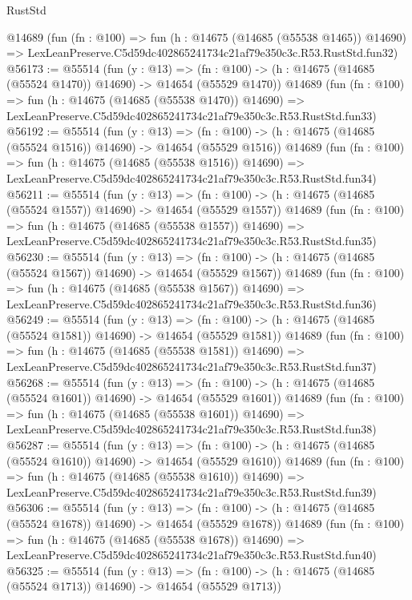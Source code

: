 \begin{lexlean}{RustStd}
\begin{coremodule}
    @14689
    (fun (fn : @100) =>
    fun (h : @14675 (@14685 (@55538 @1465)) @14690) =>
    LexLeanPreserve.C5d59dc402865241734c21af79e350c3c.R53.RustStd.fun32)
@56173 := @55514
    (fun (y : @13) =>
    (fn : @100) -> (h : @14675 (@14685 (@55524 @1470)) @14690) -> @14654 (@55529 @1470))
    @14689
    (fun (fn : @100) =>
    fun (h : @14675 (@14685 (@55538 @1470)) @14690) =>
    LexLeanPreserve.C5d59dc402865241734c21af79e350c3c.R53.RustStd.fun33)
@56192 := @55514
    (fun (y : @13) =>
    (fn : @100) -> (h : @14675 (@14685 (@55524 @1516)) @14690) -> @14654 (@55529 @1516))
    @14689
    (fun (fn : @100) =>
    fun (h : @14675 (@14685 (@55538 @1516)) @14690) =>
    LexLeanPreserve.C5d59dc402865241734c21af79e350c3c.R53.RustStd.fun34)
@56211 := @55514
    (fun (y : @13) =>
    (fn : @100) -> (h : @14675 (@14685 (@55524 @1557)) @14690) -> @14654 (@55529 @1557))
    @14689
    (fun (fn : @100) =>
    fun (h : @14675 (@14685 (@55538 @1557)) @14690) =>
    LexLeanPreserve.C5d59dc402865241734c21af79e350c3c.R53.RustStd.fun35)
@56230 := @55514
    (fun (y : @13) =>
    (fn : @100) -> (h : @14675 (@14685 (@55524 @1567)) @14690) -> @14654 (@55529 @1567))
    @14689
    (fun (fn : @100) =>
    fun (h : @14675 (@14685 (@55538 @1567)) @14690) =>
    LexLeanPreserve.C5d59dc402865241734c21af79e350c3c.R53.RustStd.fun36)
@56249 := @55514
    (fun (y : @13) =>
    (fn : @100) -> (h : @14675 (@14685 (@55524 @1581)) @14690) -> @14654 (@55529 @1581))
    @14689
    (fun (fn : @100) =>
    fun (h : @14675 (@14685 (@55538 @1581)) @14690) =>
    LexLeanPreserve.C5d59dc402865241734c21af79e350c3c.R53.RustStd.fun37)
@56268 := @55514
    (fun (y : @13) =>
    (fn : @100) -> (h : @14675 (@14685 (@55524 @1601)) @14690) -> @14654 (@55529 @1601))
    @14689
    (fun (fn : @100) =>
    fun (h : @14675 (@14685 (@55538 @1601)) @14690) =>
    LexLeanPreserve.C5d59dc402865241734c21af79e350c3c.R53.RustStd.fun38)
@56287 := @55514
    (fun (y : @13) =>
    (fn : @100) -> (h : @14675 (@14685 (@55524 @1610)) @14690) -> @14654 (@55529 @1610))
    @14689
    (fun (fn : @100) =>
    fun (h : @14675 (@14685 (@55538 @1610)) @14690) =>
    LexLeanPreserve.C5d59dc402865241734c21af79e350c3c.R53.RustStd.fun39)
@56306 := @55514
    (fun (y : @13) =>
    (fn : @100) -> (h : @14675 (@14685 (@55524 @1678)) @14690) -> @14654 (@55529 @1678))
    @14689
    (fun (fn : @100) =>
    fun (h : @14675 (@14685 (@55538 @1678)) @14690) =>
    LexLeanPreserve.C5d59dc402865241734c21af79e350c3c.R53.RustStd.fun40)
@56325 := @55514
    (fun (y : @13) =>
    (fn : @100) -> (h : @14675 (@14685 (@55524 @1713)) @14690) -> @14654 (@55529 @1713))

\end{coremodule}
\end{lexlean}
